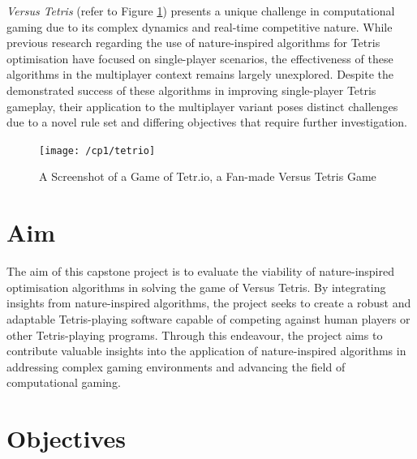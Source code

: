 \documentclass[a4paper, 12pt]{extreport}
\begin{document}
			\textit{Versus Tetris} (refer to Figure \ref{tetrio}) presents a unique challenge in computational gaming due to its complex dynamics and real-time competitive nature. While previous research regarding the use of nature-inspired algorithms for Tetris optimisation have focused on single-player scenarios, the effectiveness of these algorithms in the multiplayer context remains largely unexplored. Despite the demonstrated success of these algorithms in improving single-player Tetris gameplay, their application to the multiplayer variant poses distinct challenges due to a novel rule set and differing objectives that require further investigation.
			
			\begin{figure}
				\texttt{[image: /cp1/tetrio]}
				\caption{A Screenshot of a Game of Tetr.io, a Fan-made Versus Tetris Game}
				\label{tetrio}
			\end{figure}
		
		\section{Aim}
		
			
			The aim of this capstone project is to evaluate the viability of nature-inspired optimisation algorithms in solving the game of Versus Tetris. By integrating insights from nature-inspired algorithms, the project seeks to create a robust and adaptable Tetris-playing software capable of competing against human players or other Tetris-playing programs. Through this endeavour, the project aims to contribute valuable insights into the application of nature-inspired algorithms in addressing complex gaming environments and advancing the field of computational gaming.
		
		\section{Objectives}
		
			
\end{document}
